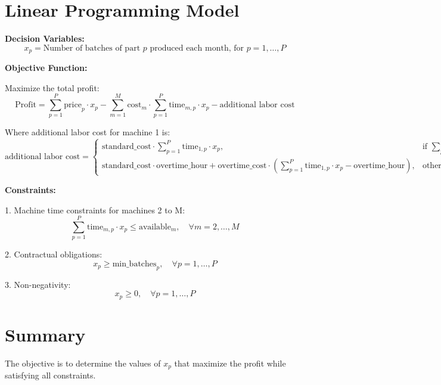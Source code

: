 \documentclass{article}
\begin{document}
\section*{Linear Programming Model}

\textbf{Decision Variables:}
\[
x_p = \text{Number of batches of part } p \text{ produced each month, for } p = 1, \ldots, P
\]

\textbf{Objective Function:}

Maximize the total profit:
\[
\text{Profit} = \sum_{p=1}^{P} \text{price}_p \cdot x_p - \sum_{m=1}^{M} \text{cost}_m \cdot \sum_{p=1}^{P} \text{time}_{m,p} \cdot x_p - \text{additional labor cost}
\]

Where additional labor cost for machine 1 is:
\[
\text{additional labor cost} = \begin{cases} 
\text{standard\_cost} \cdot \sum_{p=1}^{P} \text{time}_{1,p} \cdot x_p, & \text{if } \sum_{p=1}^{P} \text{time}_{1,p} \cdot x_p \leq \text{overtime\_hour} \\
\text{standard\_cost} \cdot \text{overtime\_hour} + \text{overtime\_cost} \cdot \left( \sum_{p=1}^{P} \text{time}_{1,p} \cdot x_p - \text{overtime\_hour} \right), & \text{otherwise}
\end{cases}
\]

\textbf{Constraints:}

1. Machine time constraints for machines 2 to M:
\[
\sum_{p=1}^{P} \text{time}_{m,p} \cdot x_p \leq \text{available}_m, \quad \forall m = 2, \ldots, M
\]

2. Contractual obligations:
\[
x_p \geq \text{min\_batches}_p, \quad \forall p = 1, \ldots, P
\]

3. Non-negativity:
\[
x_p \geq 0, \quad \forall p = 1, \ldots, P
\]

\section*{Summary}

The objective is to determine the values of \( x_p \) that maximize the profit while satisfying all constraints.
\end{document}
